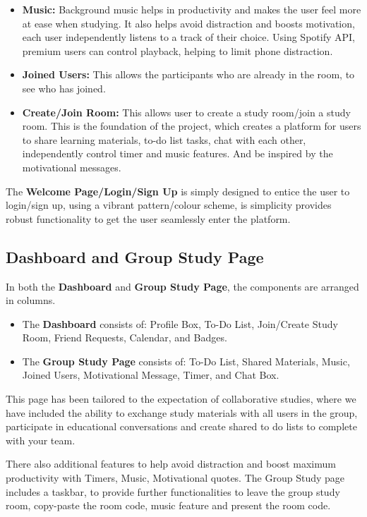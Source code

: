 \begin{itemize}
    \item \textbf{Music: }Background music helps in productivity and makes the user feel more at ease when studying. It also helps avoid distraction and boosts motivation, each user independently listens to a track of their choice. Using Spotify API, premium users can control playback, helping to limit phone distraction.
    \item \textbf{Joined Users:} This allows the participants who are already in the room, to see who has joined.
    \item \textbf{Create/Join Room:} This allows user to create a study room/join a study room. This is the foundation of the project, which creates a platform for users to share learning materials, to-do list tasks, chat with each other, independently control timer and  music features.  And be inspired by the motivational messages. 

\end{itemize}

The \textbf{Welcome Page/Login/Sign Up} is simply designed to entice the user to login/sign up, using a vibrant pattern/colour scheme, is simplicity provides robust functionality to get the user seamlessly enter the platform.

\subsection{Dashboard and Group Study Page}
In both the \textbf{Dashboard} and \textbf{Group Study Page}, the components are arranged in columns. 

\begin{itemize}
    \item The \textbf{Dashboard} consists of: Profile Box, To-Do List, Join/Create Study Room, Friend Requests, Calendar, and Badges.
    \item The \textbf{Group Study Page} consists of: To-Do List, Shared Materials, Music, Joined Users, Motivational Message, Timer, and Chat Box.
\end{itemize}
 
This page has been tailored to the expectation of collaborative studies, where we have included the ability to exchange study materials with all users in the group, participate in educational conversations and create shared to do lists to complete with your team. 

There also additional features to help avoid distraction and boost maximum productivity with Timers, Music, Motivational quotes. 
The Group Study page includes a taskbar, to provide further functionalities to leave the group study room, copy-paste the room code, music feature and present the room code.

